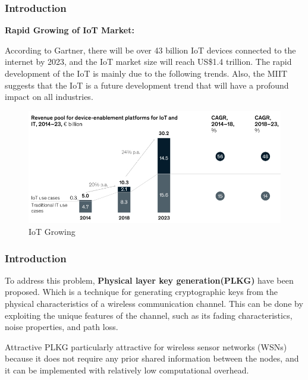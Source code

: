 \documentclass{beamer}
\begin{document}
\begin{frame}
  \frametitle{Introduction}
\textbf{Rapid Growing of IoT Market:}

According to Gartner\cite{gartnerresearchiot}, there will be over 43 billion IoT devices connected to the internet by 2023, and the IoT market size will reach US\$1.4 trillion. The rapid development of the IoT is mainly due to the following trends. Also, the MIIT suggests that the IoT is a future development trend that will have a profound impact on all industries\cite{iot13th5yr}. 

\begin{figure}
  \centering
  \includegraphics[width=0.7\linewidth]{figures/iotgrowing.png}
  \caption{IoT Growing\cite{Dahlqvist_Patel_Rajko_Shulman_2019}}
  \label{fig:iotgrowing}
\end{figure}

\end{frame}



\begin{frame}
\frametitle{Introduction}

To address this problem, \textbf{Physical layer key generation(PLKG)} have been proposed. Which is a technique for generating cryptographic keys from the physical characteristics of a wireless communication channel. This can be done by exploiting the unique features of the channel, such as its fading characteristics, noise properties, and path loss. \pause
\begin{block}{Attractive}
  PLKG particularly attractive for wireless sensor networks (WSNs) because it does not require any prior shared information between the nodes, and it can be implemented with relatively low computational overhead.
\end{block}

\end{frame}
\end{document}
